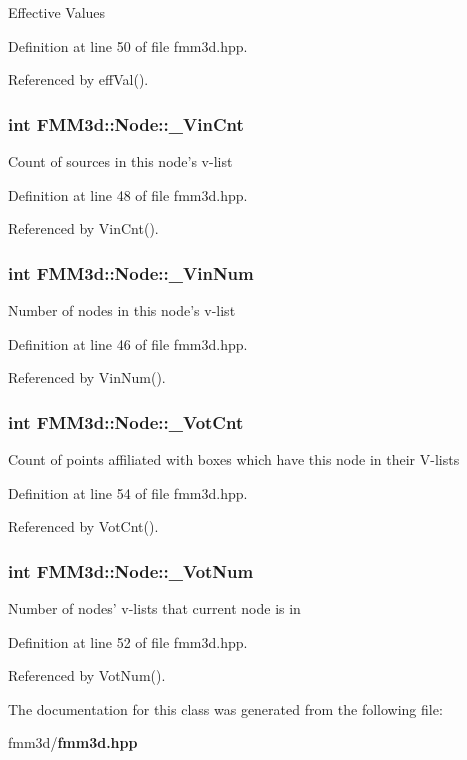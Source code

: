 Effective Values 

Definition at line 50 of file fmm3d.hpp.

Referenced by eff\-Val().
\subsubsection{\setlength{\rightskip}{0pt plus 5cm}int {\bf FMM3d::Node::\_\-Vin\-Cnt}\hspace{0.3cm}{\tt  [protected]}}\label{classFMM3d_1_1Node_d6198c765494a3ae0f26c61b24164c8c_d6198c765494a3ae0f26c61b24164c8c}


Count of sources in this node's v-list 

Definition at line 48 of file fmm3d.hpp.

Referenced by Vin\-Cnt().
\subsubsection{\setlength{\rightskip}{0pt plus 5cm}int {\bf FMM3d::Node::\_\-Vin\-Num}\hspace{0.3cm}{\tt  [protected]}}\label{classFMM3d_1_1Node_d22eb243315052f365c8cb917fe0b190_d22eb243315052f365c8cb917fe0b190}


Number of nodes in this node's v-list 

Definition at line 46 of file fmm3d.hpp.

Referenced by Vin\-Num().
\subsubsection{\setlength{\rightskip}{0pt plus 5cm}int {\bf FMM3d::Node::\_\-Vot\-Cnt}\hspace{0.3cm}{\tt  [protected]}}\label{classFMM3d_1_1Node_1bef85f2365bf1dcefd0eb73446cdb8a_1bef85f2365bf1dcefd0eb73446cdb8a}


Count of points affiliated with boxes which have this node in their V-lists 

Definition at line 54 of file fmm3d.hpp.

Referenced by Vot\-Cnt().
\subsubsection{\setlength{\rightskip}{0pt plus 5cm}int {\bf FMM3d::Node::\_\-Vot\-Num}\hspace{0.3cm}{\tt  [protected]}}\label{classFMM3d_1_1Node_60c1e534c329f1c3ccf694b7fafea4db_60c1e534c329f1c3ccf694b7fafea4db}


Number of nodes' v-lists that current node is in 

Definition at line 52 of file fmm3d.hpp.

Referenced by Vot\-Num().

The documentation for this class was generated from the following file:\begin{CompactItemize}
\item 
fmm3d/{\bf fmm3d.hpp}\end{CompactItemize}
